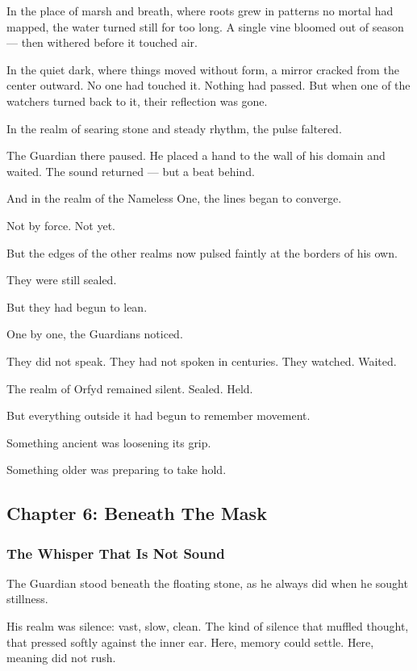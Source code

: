 \documentclass[12pt]{article}
\begin{document}
In the place of marsh and breath, where roots grew in patterns no mortal had mapped, the water turned still for too long. A single vine bloomed out of season — then withered before it touched air.

In the quiet dark, where things moved without form, a mirror cracked from the center outward. No one had touched it. Nothing had passed. But when one of the watchers turned back to it, their reflection was gone.

In the realm of searing stone and steady rhythm, the pulse faltered.

The Guardian there paused. He placed a hand to the wall of his domain and waited. The sound returned — but a beat behind.

And in the realm of the Nameless One, the lines began to converge.

Not by force. Not yet.

But the edges of the other realms now pulsed faintly at the borders of his own.

They were still sealed.

But they had begun to lean.

One by one, the Guardians noticed.

They did not speak. They had not spoken in centuries. They watched. Waited.

The realm of Orfyd remained silent. Sealed. Held.

But everything outside it had begun to remember movement.

Something ancient was loosening its grip.

Something older was preparing to take hold.



\newpage

\subsection{Chapter 6: Beneath The Mask}

\vspace{.5in}

\subsubsection{The Whisper That Is Not Sound}

The Guardian stood beneath the floating stone, as he always did when he sought stillness.

His realm was silence: vast, slow, clean. The kind of silence that muffled thought, that pressed softly against the inner ear. Here, memory could settle. Here, meaning did not rush.
\end{document}
